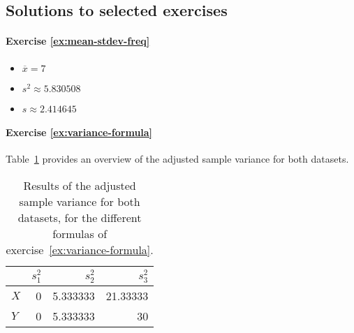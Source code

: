 




\subsection{Solutions to selected exercises}

\paragraph{Exercise \ref{ex:mean-stdev-freq}}

\begin{itemize}
  \item $\overline{x} = 7$
  \item $s^2 \approx 5.830508$
  \item $s \approx 2.414645$
\end{itemize}

\paragraph{Exercise \ref{ex:variance-formula}}
Table~\ref{tab:opl-variance-ht} provides an overview of the adjusted sample variance for both datasets.

\begin{table}
  \centering
  \begin{tabular}{@{}l|rrr@{}}
    \toprule
      & \textbf{$s^{2}_{1}$} & \textbf{$s^{2}_{2}$} & \textbf{$s^{2}_{3}$} \\
    \midrule                
      \textbf{$ X $} & 0           & 5.333333    & 21.33333    \\ 
      \textbf{$ Y $} & 0           & 5.333333    & 30          \\           
    \bottomrule
  \end{tabular}
  \caption{Results of the adjusted sample variance for both datasets, for the different formulas of exercise~\ref{ex:variance-formula}.}
  \label{tab:opl-variance-ht}
\end{table}

